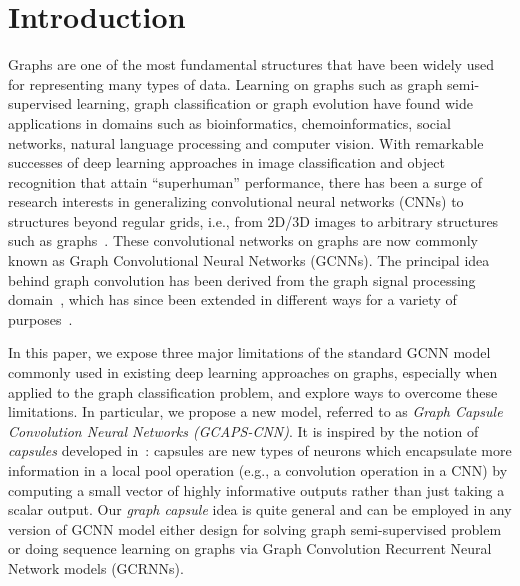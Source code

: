 \documentclass{article}
\begin{document}
\section{Introduction}
Graphs are one of the most fundamental structures that have been widely used for representing many types of data. Learning on graphs such as graph semi-supervised learning, graph classification or  graph evolution have found wide applications  in domains such as  bioinformatics,  chemoinformatics,  social networks, natural language processing and computer vision. With remarkable successes of deep learning approaches in image  classification and object recognition that attain ``superhuman'' performance, there has been a surge of research interests in generalizing convolutional neural networks (CNNs) to structures beyond regular grids, i.e., from 2D/3D images to arbitrary structures such as graphs~\cite{bruna2013spectral,henaff2015deep,defferrard2016convolutional,kipf2016semi}. These convolutional networks on graphs are now commonly known as Graph Convolutional Neural Networks (GCNNs). The principal idea behind graph convolution  has been derived from the  graph signal processing domain~\cite{shuman2013emerging}, which has since been extended in different ways for a variety of purposes~\cite{duvenaud2015convolutional, gilmer2017neural, kondor2018covariant}. 

In this paper, we  expose three major limitations of the standard GCNN model commonly used in existing deep learning approaches on graphs, especially when applied to the graph classification  problem, and explore ways to overcome these limitations. In particular, we propose a new model, referred to as {\em Graph Capsule Convolution Neural Networks (GCAPS-CNN)}. It is  inspired by the notion of {\em capsules} developed in~\cite{hinton2011transforming}: capsules are new types of neurons which encapsulate more information in a local pool operation (e.g., a convolution operation in a CNN)  by computing a small vector of highly informative  outputs rather than just taking a scalar output. Our {\em graph capsule} idea is quite general and can be employed in any version of GCNN model either design for solving  graph semi-supervised problem or doing sequence learning on graphs via Graph Convolution Recurrent Neural Network models (GCRNNs).  
\end{document}
